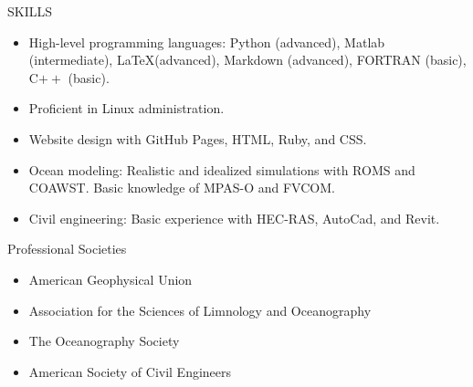 \documentclass{resume} %
\begin{document}
\begin{rSection}{SKILLS}
\begin{itemize}
    \item High-level programming languages: Python (advanced), Matlab (intermediate), \LaTeX (advanced), Markdown (advanced), FORTRAN (basic), C$++$ (basic).
    \item Proficient in Linux administration.
    \item Website design with GitHub Pages, HTML, Ruby, and CSS.
    \item Ocean modeling: Realistic and idealized simulations with ROMS and COAWST. Basic knowledge of MPAS-O and FVCOM. 
    \item Civil engineering: Basic experience with HEC-RAS, AutoCad, and Revit.
\end{itemize}
\end{rSection}

\begin{rSection}{Professional Societies} \itemsep -3pt {}
\begin{itemize}
    \item American Geophysical Union
    \item Association for the Sciences of Limnology and Oceanography
    \item The Oceanography Society 
    \item American Society of Civil Engineers
\end{itemize}
\end{rSection}


\end{document}
